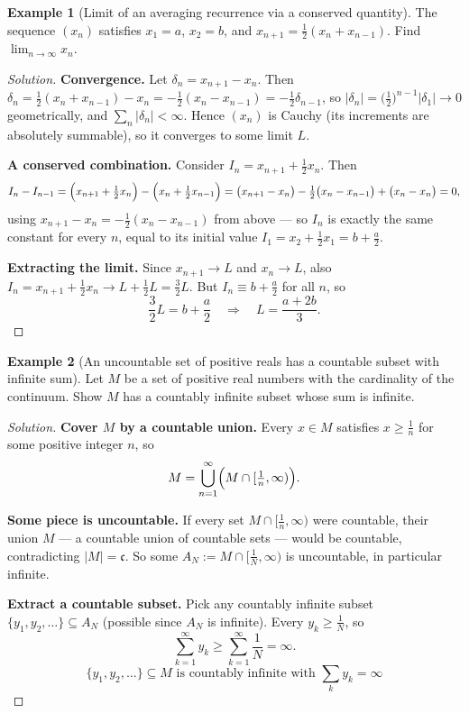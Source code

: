 \documentclass[11pt]{article}
\theoremstyle{definition}
\newtheorem{example}{Example}[section]
\begin{document}
\begin{example}[Limit of an averaging recurrence via a conserved quantity]
The sequence $(x_n)$ satisfies $x_1=a$, $x_2=b$, and $x_{n+1}=\tfrac12(x_n+x_{n-1})$. Find $\lim_{n\to\infty}x_n$.
\end{example}
\begin{proof}[Solution]
\textbf{Convergence.} Let $\delta_n=x_{n+1}-x_n$. Then $\delta_n=\tfrac12(x_n+x_{n-1})-x_n=-\tfrac12(x_n-x_{n-1})=-\tfrac12\delta_{n-1}$, so $|\delta_n|=\bigl(\tfrac12\bigr)^{n-1}|\delta_1|\to0$ geometrically, and $\sum_n|\delta_n|<\infty$. Hence $(x_n)$ is Cauchy (its increments are absolutely summable), so it converges to some limit $L$.

\textbf{A conserved combination.} Consider $I_n=x_{n+1}+\tfrac12x_n$. Then
\[
I_n-I_{n-1}=\Bigl(x_{n+1}+\tfrac12x_n\Bigr)-\Bigl(x_n+\tfrac12x_{n-1}\Bigr)=\bigl(x_{n+1}-x_n\bigr)-\tfrac12\bigl(x_n-x_{n-1}\bigr)+\bigl(x_n-x_n\bigr)=0,
\]
using $x_{n+1}-x_n=-\tfrac12(x_n-x_{n-1})$ from above — so $I_n$ is exactly the same constant for every $n$, equal to its initial value $I_1=x_2+\tfrac12x_1=b+\tfrac a2$.

\textbf{Extracting the limit.} Since $x_{n+1}\to L$ and $x_n\to L$, also $I_n=x_{n+1}+\tfrac12x_n\to L+\tfrac12L=\tfrac32L$. But $I_n\equiv b+\tfrac a2$ for all $n$, so
\[
\frac32L=b+\frac a2\quad\Longrightarrow\quad\boxed{L=\frac{a+2b}3}.
\]
\end{proof}

\begin{example}[An uncountable set of positive reals has a countable subset with infinite sum]
Let $M$ be a set of positive real numbers with the cardinality of the continuum. Show $M$ has a countably infinite subset whose sum is infinite.
\end{example}
\begin{proof}[Solution]
\textbf{Cover $M$ by a countable union.} Every $x\in M$ satisfies $x\ge\frac1n$ for some positive integer $n$, so
\[
M=\bigcup_{n=1}^\infty\Bigl(M\cap[\tfrac1n,\infty)\Bigr).
\]

\textbf{Some piece is uncountable.} If every set $M\cap[\frac1n,\infty)$ were countable, their union $M$ — a countable union of countable sets — would be countable, contradicting $|M|=\mathfrak c$. So some $A_N:=M\cap[\frac1N,\infty)$ is uncountable, in particular infinite.

\textbf{Extract a countable subset.} Pick any countably infinite subset $\{y_1,y_2,\dots\}\subseteq A_N$ (possible since $A_N$ is infinite). Every $y_k\ge\frac1N$, so
\[
\sum_{k=1}^\infty y_k\ge\sum_{k=1}^\infty\frac1N=\infty.
\]
\[
\boxed{\{y_1,y_2,\dots\}\subseteq M\text{ is countably infinite with }\sum_ky_k=\infty}
\]
\end{proof}
\end{document}

